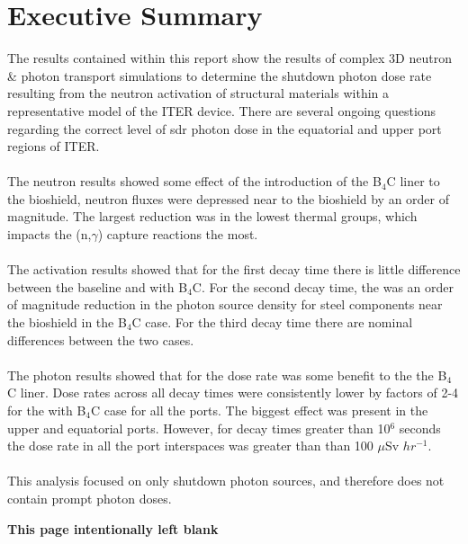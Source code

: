 \documentclass[12pt]{article}
\newcommand*{\blankpage}{%
\vspace*{\fill}
\begin{center}
 \centering \textbf{This page intentionally left blank}
\end{center}
\vspace{\fill}}
\begin{document}
\newpage
\section*{Executive Summary}
The results contained within this report show the results of complex 3D neutron
\& photon transport simulations to determine the shutdown photon dose rate
resulting from the neutron activation of structural materials within a
representative model of the ITER device. There are several ongoing questions
regarding the correct level of \gls{sdr} photon dose in the equatorial and upper
port regions of ITER.
\\
\\
The neutron results showed some effect of the introduction of the B$_4$C liner 
to the bioshield, neutron fluxes were depressed near to the bioshield by an 
order of magnitude. The largest reduction was in the lowest thermal groups, 
which impacts the (n,$\gamma$) capture reactions the most.
\\
\\
The activation results showed that for the first decay time there is little 
difference between the baseline and with B$_4$C. For the second decay time, 
the was an order of magnitude reduction in the photon source density for 
steel components near the bioshield in the B$_4$C case. For the third decay
time there are nominal differences between the two cases.
\\
\\
The photon results showed that for the dose rate was some benefit to the 
the B$_4$C liner. Dose rates across all decay times were consistently lower
by factors of 2-4 for the with B$_4$C case for all the ports. The biggest effect
was present in the upper and equatorial ports. However, for decay times greater
than 10$^6$ seconds the dose rate in all the port interspaces was greater than
than 100 $\mu$Sv $hr^{-1}$. 
\\
\\
This analysis focused on only shutdown photon sources, and therefore does not
contain prompt photon doses.

\newpage
\blankpage

\newpage
\end{document}
